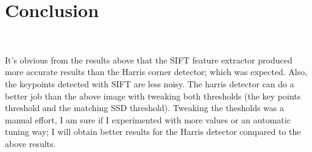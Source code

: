 \documentclass[]{article}
\begin{document}
\section{Conclusion}\

It's obvious from the results above that the SIFT feature extractor produced more accurate results than the Harris corner detector; which was expected. Also, the keypoints detected with SIFT are less noisy. The harris detector can do a better job than the above image with tweaking both thresholds (the key points threshold and the matching SSD threshold). Tweaking the thesholds was a manual effort, I am sure if I experimented with more values or an automatic tuning way; I will obtain better results for the Harris detector compared to the above results.
\end{document}

